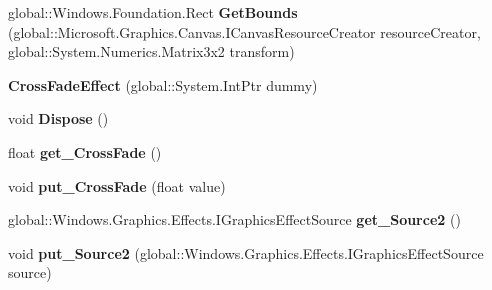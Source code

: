 \begin{DoxyCompactItemize}
\item 
\mbox{\label{class_microsoft_1_1_graphics_1_1_canvas_1_1_effects_1_1_cross_fade_effect_ab77a284b694bb6816a8514e82b3924f0}} 
global\+::\+Windows.\+Foundation.\+Rect {\bfseries Get\+Bounds} (global\+::\+Microsoft.\+Graphics.\+Canvas.\+I\+Canvas\+Resource\+Creator resource\+Creator, global\+::\+System.\+Numerics.\+Matrix3x2 transform)
\item 
\mbox{\label{class_microsoft_1_1_graphics_1_1_canvas_1_1_effects_1_1_cross_fade_effect_a1ccb8010e1721e5b73f7f2d332372d07}} 
{\bfseries Cross\+Fade\+Effect} (global\+::\+System.\+Int\+Ptr dummy)
\item 
\mbox{\label{class_microsoft_1_1_graphics_1_1_canvas_1_1_effects_1_1_cross_fade_effect_a7e3429fb00e0d8c989d1ee019f8e917d}} 
void {\bfseries Dispose} ()
\item 
\mbox{\label{class_microsoft_1_1_graphics_1_1_canvas_1_1_effects_1_1_cross_fade_effect_a03a1b2e46780db48c746c36e0a0328df}} 
float {\bfseries get\+\_\+\+Cross\+Fade} ()
\item 
\mbox{\label{class_microsoft_1_1_graphics_1_1_canvas_1_1_effects_1_1_cross_fade_effect_a1bb024927d16d9d1077994bdd49ff1b3}} 
void {\bfseries put\+\_\+\+Cross\+Fade} (float value)
\item 
\mbox{\label{class_microsoft_1_1_graphics_1_1_canvas_1_1_effects_1_1_cross_fade_effect_ae64842db8377a81fbe51b6e9c8230622}} 
global\+::\+Windows.\+Graphics.\+Effects.\+I\+Graphics\+Effect\+Source {\bfseries get\+\_\+\+Source2} ()
\item 
\mbox{\label{class_microsoft_1_1_graphics_1_1_canvas_1_1_effects_1_1_cross_fade_effect_a03f909bfef26ae588f520b5c6f561b89}} 
void {\bfseries put\+\_\+\+Source2} (global\+::\+Windows.\+Graphics.\+Effects.\+I\+Graphics\+Effect\+Source source)

\end{DoxyCompactItemize}
